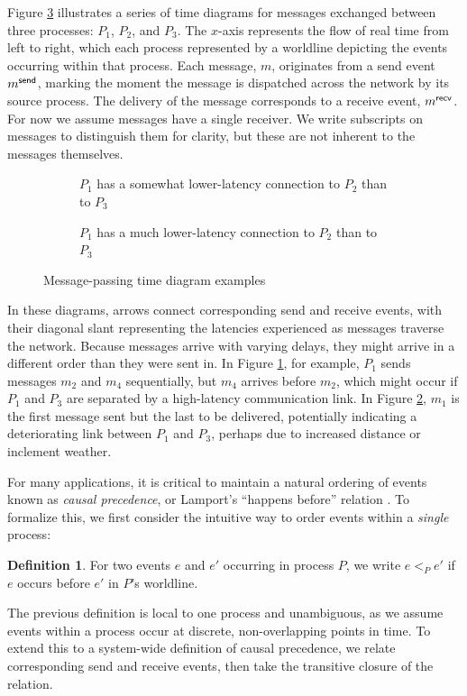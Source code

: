 \documentclass[]             %
{NASA}                       %
\theoremstyle{definition}
\newtheorem{definition}[theorem]{Definition}
\begin{document}
Figure \ref{fig:message-latencies} illustrates a series of time
diagrams for messages exchanged between three processes: $P_1$, $P_2$,
and $P_3$. The $x$-axis represents the flow of real time from left to
right, which each process represented by a worldline depicting the
events occurring within that process. Each message, $m$, originates
from a send event $m_{}^{\mathsf{send}}$, marking the moment the message is
dispatched across the network by its source process. The delivery of
the message corresponds to a receive event, $m_{}^{\mathsf{recv}}$. For now we
assume messages have a single receiver. We write subscripts on
messages to distinguish them for clarity, but these are not inherent
to the messages themselves.

\begin{figure}[p]
  \setlength\belowcaptionskip{5ex}
  \begin{subfigure}{1\textwidth}
    \centering
    
    \caption{$P_1$ has a somewhat lower-latency connection to $P_2$ than to $P_3$}
    \label{fig:message-latencies-a}
  \end{subfigure}
  \begin{subfigure}{1\textwidth}
    \centering 
    \caption{$P_1$ has a much lower-latency connection to $P_2$ than to $P_3$}
    \label{fig:message-latencies-b}
  \end{subfigure}
  \caption{Message-passing time diagram examples}
  \label{fig:message-latencies}
\end{figure}

In these diagrams, arrows connect corresponding send and receive
events, with their diagonal slant representing the latencies
experienced as messages traverse the network. Because messages arrive
with varying delays, they might arrive in a different order than they
were sent in. In Figure \ref{fig:message-latencies-a}, for example,
$P_1$ sends messages $m_2$ and $m_4$ sequentially, but $m_4$ arrives
before $m_2$, which might occur if $P_1$ and $P_3$ are separated by a
high-latency communication link. In Figure
\ref{fig:message-latencies-b}, $m_1$ is the first message sent but the
last to be delivered, potentially indicating a deteriorating link
between $P_1$ and $P_3$, perhaps due to increased distance or
inclement weather.

For many applications, it is critical to maintain a natural ordering
of events known as \emph{causal precedence}, or Lamport's ``happens
before'' relation \cite{1978:lamportclocks}. To formalize this, we
first consider the intuitive way to order events within a
\emph{single} process:
\begin{definition}
  For two events $e$ and $e'$ occurring in process $P$, we
  write $e <_{P} e'$ if $e$ occurs before $e'$ in $P$'s
  worldline.
\end{definition}
The previous definition is local to one process and unambiguous, as we
assume events within a process occur at discrete, non-overlapping
points in time. To extend this to a system-wide definition of causal
precedence, we relate corresponding send and receive events, then take
the transitive closure of the relation.
\end{document}
